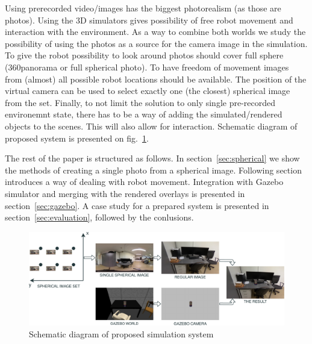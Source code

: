 \documentclass{svproc}
\begin{document}
Using prerecorded video/images has the biggest photorealism (as those are photos). Using the 3D simulators gives 
possibility of free robot movement and interaction with the environment. As a way to combine both worlds
we study the possibility of using the photos as a source for the camera image in the simulation. 
To give the robot possibility to look around photos should cover full sphere (360\textdegree panorama or 
full spherical photo). To have freedom of movement images from (almost) all possible robot locations should 
be available. The position of the virtual camera can be used to select exactly one (the closest) spherical image from the set.
Finally, to not limit the solution to only single pre-recorded environemnt state, there has to be
a way of adding the simulated/rendered objects to the scenes. This will also allow for interaction. Schematic
diagram of proposed system is presented on fig.~\ref{fig:flow}.

The rest of the paper is structured as follows. In section~\ref{sec:spherical} we show the methods of creating
a single photo from a spherical image. Following section introduces a way of dealing with robot movement.
Integration with Gazebo simulator and merging with the rendered overlays is presented in section~\ref{sec:gazebo}.
A case study for a prepared system is presented in section~\ref{sec:evaluation}, followed by the conlusions.

\begin{figure}[ht!]
\includegraphics[width=\textwidth]{img/drawio/flow.pdf}
\caption{Schematic diagram of proposed simulation system}
\label{fig:flow}
\end{figure}


\end{document}
